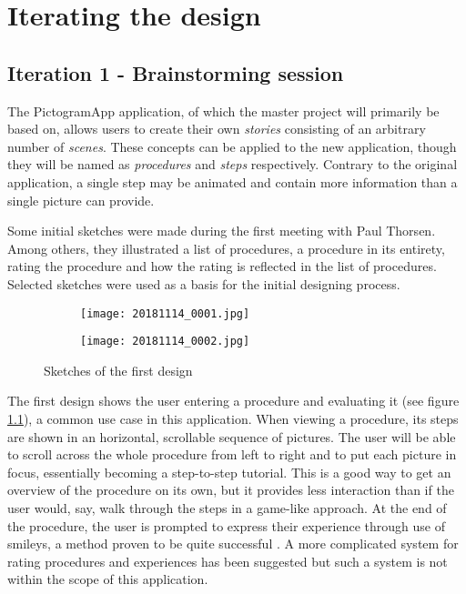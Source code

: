\chapter{Iterating the design}
\label{ch:iterating}

\section{Iteration 1 - Brainstorming session}

The PictogramApp application, of which the master project will primarily be based on, allows users to create their own \emph{stories} consisting of an arbitrary number of \emph{scenes}. These concepts can be applied to the new application, though they will be named as \emph{procedures} and \emph{steps} respectively. Contrary to the original application, a single step may be animated and contain more information than a single picture can provide.

Some initial sketches were made during the first meeting with Paul Thorsen. Among others, they illustrated a list of procedures, a procedure in its entirety, rating the procedure and how the rating is reflected in the list of procedures. Selected sketches were used as a basis for the initial designing process.

\begin{figure}
    \centering
    \begin{subfigure}{0.95\textwidth}
        \centering
        \texttt{[image: 20181114\_0001.jpg]}
        \label{fig:sketch-viewprocedure}
    \end{subfigure}
    \begin{subfigure}{0.95\textwidth}
        \centering
        \texttt{[image: 20181114\_0002.jpg]}
        \label{fig:sketch-editprocedure}
    \end{subfigure}
    \caption{Sketches of the first design}
    \label{fig:sketch-firstdesign}
\end{figure}

The first design shows the user entering a procedure and evaluating it (see figure \ref{fig:sketch-viewprocedure}), a common use case in this application. When viewing a procedure, its steps are shown in an horizontal, scrollable sequence of pictures. The user will be able to scroll across the whole procedure from left to right and to put each picture in focus, essentially becoming a step-to-step tutorial. This is a good way to get an overview of the procedure on its own, but it provides less interaction than if the user would, say, walk through the steps in a game-like approach. At the end of the procedure, the user is prompted to express their experience through use of smileys, a method proven to be quite successful \parencite{stalberg2016}. A more complicated system for rating procedures and experiences has been suggested but such a system is not within the scope of this application.

